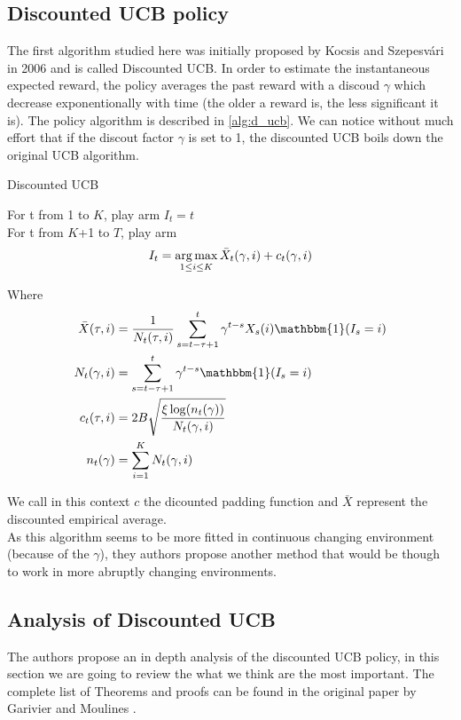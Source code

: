 \subsection{Discounted UCB policy}

The first algorithm studied here was initially proposed by Kocsis and Szepesvári in 2006 \cite{Kocsis06banditbased} and is called Discounted UCB. In order to estimate the instantaneous expected reward, the policy averages the past reward with a discoud $\gamma$ which decrease exponentionally with time (the older a reward is, the less significant it is).  The policy algorithm is described in \ref{alg:d_ucb}. We can notice without much effort that if the discout factor $\gamma$ is set to 1, the discounted UCB boils down the original UCB algorithm.\\

\begin{algorithm}[ht]
    \caption{Discounted UCB}
    \label{alg:d_ucb}
    For t from 1 to $K$, play arm $I_t = t$ \\
    For t from $K$+1 to $T$, play arm 
    $$ I_t = \operatorname*{arg\,max}_{1\leq i \leq K} \bar X_t(\gamma,i) + c_t(\gamma,i)$$
\end{algorithm}

Where
\begin{align}
\bar{X}(\tau, i) &= \frac{1}{N_t(\tau, i)}
\sum_{s=t-\tau+1}^t \gamma^{t-s}X_s(i)\mathbbm{1}(I_s=i)\\
N_t(\gamma, i) &= \sum_{s=t-\tau+1}^t \gamma^{t-s}\mathbbm{1}(I_s=i)\\
c_t(\tau, i) &= 2B\sqrt{\frac{\xi \log(n_t(\gamma))}{N_t(\gamma,i)}}\\
n_t(\gamma) &= \sum_{i=1}^K N_t(\gamma,i)
\end{align}

We call in this context $c$ the dicounted padding function and $\bar X$ represent the discounted empirical average.\\
As this algorithm seems to be more fitted in continuous changing environment (because of the $\gamma$), they authors propose another method that would be though to work in more abruptly changing environments.

\subsection{Analysis of Discounted UCB}

The authors propose an in depth analysis of the discounted UCB policy, in this section we are going to review the what we think are the most important. The complete list of Theorems and proofs can be found in the original paper by Garivier and Moulines \cite{garivier2008upperconfidence}.\\
